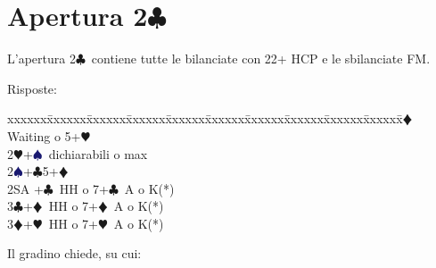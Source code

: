 \documentclass[a4paper,italian]{article}
\newcommand{\BC}{\textcolor{OliveGreen}{$\clubsuit$}}
\newcommand{\BD}{\textcolor{RedOrange}{$\vardiamondsuit$}}
\newcommand{\BH}{\textcolor{Red2}{$\varheartsuit${}}}
\newcommand{\BS}{\textcolor{MidnightBlue}{$\spadesuit${}}}
\newcommand{\pdfc}{\texorpdfstring{\BC{}}{C}}
\newenvironment{bidtable}
{\begin{tabbing}

    xxxxxx\=xxxxxx\=xxxxxx\=xxxxxx\=xxxxxx\=xxxxxx\=xxxxxx\=xxxxxx\=xxxxxx\=xxxxxx\=\kill}
{\end{tabbing} }%
\newenvironment{varie}[1]
{\begin{tcolorbox}[colframe=green!40!black,title=#1]}
    {
\end{tcolorbox} }%
\begin{document}
                                    \section{Apertura 2\pdfc}
                                    \begin{multicols}{2}


                                        L'apertura 2\BC\ contiene tutte le bilanciate con 22+ HCP e le sbilanciate FM.

                                        Risposte:

                                        \begin{bidtable}
                                            2\BD \> Waiting o 5+\BH \\
                                            2\BH {}+\BS\ dichiarabili o max\\
                                            2\BS {}+\BC 5+\BD \\
                                            2SA +\BC\ HH o 7+\BC\ A o K(*)\\
                                            3\BC {}+\BD\ HH o 7+\BD\ A o K(*)\\
                                            3\BD {}+\BH\ HH o 7+\BH\ A o K(*)
                                        \end{bidtable}
                                        \begin{varie}{(*) Relay richiesta onori}

                                            Il gradino chiede, su cui:


\end{varie}
\end{multicols}
\end{document}
